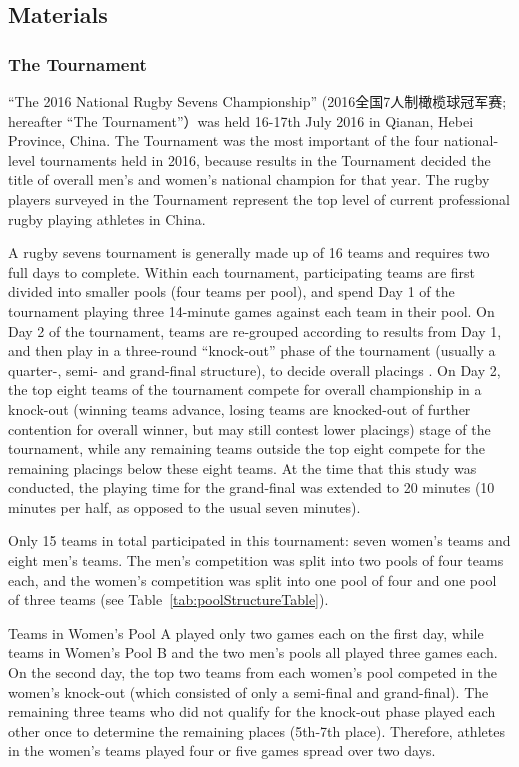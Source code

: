 \begin{CJK}{UTF8}{gbsn}
\subsection{Materials}

\subsubsection{The Tournament}
``The 2016 National Rugby Sevens Championship'' (2016全国7人制橄榄球冠军赛; hereafter ``The Tournament''）was held 16-17th July 2016 in Qianan, Hebei Province, China. The Tournament was the most important of the four national-level tournaments held in 2016, because results in the Tournament decided the title of overall men's and women’s national champion for that year. The rugby players surveyed in the Tournament represent the top level of current professional rugby playing athletes in China.

A rugby sevens tournament is generally made up of 16 teams and requires two full days to complete.  Within each tournament, participating teams are first divided into smaller pools (four teams per pool), and spend Day 1 of the tournament playing three 14-minute games against each team in their pool. On Day 2 of the tournament, teams are re-grouped according to results from Day 1, and then play in a three-round ``knock-out'' phase of the tournament (usually a quarter-, semi- and grand-final structure), to decide overall placings \citep[][]{WorldRugby2018}. On Day 2, the top eight teams of the tournament compete for overall championship in a knock-out (winning teams advance, losing teams are knocked-out of further contention for overall winner, but may still contest lower placings) stage of the tournament, while any remaining teams outside the top eight compete for the remaining placings below these eight teams. At the time that this study was conducted, the playing time for the grand-final was extended to 20 minutes (10 minutes per half, as opposed to the usual seven minutes).

Only 15 teams in total participated in this tournament:  seven women's teams and eight men's teams. The men’s competition was split into two pools of four teams each, and the women’s competition was split into one pool of four and one pool of three teams (see Table~\ref{tab:poolStructureTable}).

Teams in Women's Pool A played only two games each on the first day, while teams in Women's Pool B and the two men's pools all played three games each. On the second day, the top two teams from each women's pool competed in the women's knock-out (which consisted of only a semi-final and grand-final).  The remaining three teams who did not qualify for the knock-out phase played each other once to determine the remaining places (5th-7th place).  Therefore, athletes in the women's teams played four or five games spread over two days.


\end{CJK}
